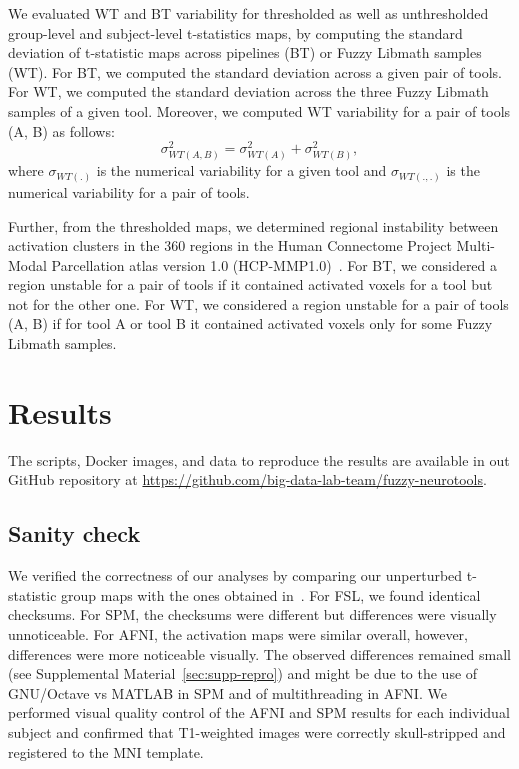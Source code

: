 \documentclass[11pt,onecolumn]{article}
\begin{document}
We evaluated WT and BT variability for thresholded as well as unthresholded
group-level and subject-level t-statistics maps, by computing the
standard deviation of t-statistic maps across pipelines (BT) or Fuzzy Libmath samples (WT). For BT, we computed the standard deviation 
across a given pair of tools.
For WT, we computed the standard deviation across the three
Fuzzy Libmath samples of a given tool. Moreover, we computed WT variability for a pair of tools (A, B) as follows:
\begin{equation}
  \sigma_{WT(A,B)}^2 = \sigma_{WT(A)}^2 + \sigma_{WT(B)}^2,
  \label{eq:wt-pair}
\end{equation}
where $\sigma_{WT(.)}$ is the numerical variability for a given tool
and $\sigma_{WT(., .)}$ is the numerical variability for a pair of tools.

Further, from the thresholded maps, we determined regional instability
between activation clusters in the 360 regions in the Human Connectome
Project Multi-Modal Parcellation atlas version 1.0
(HCP-MMP1.0)~\cite{glasser2016multi}. For BT, we considered a region
unstable for a pair of tools if it contained activated voxels for a tool
but not for the other one. For WT, we considered a region unstable for a
pair of tools (A, B) if for tool A or tool B it contained activated voxels only for some Fuzzy Libmath
samples.

\section{Results}
The scripts, Docker images, and data to reproduce the results are available
in out GitHub repository at
\url{https://github.com/big-data-lab-team/fuzzy-neurotools}.


\subsection{Sanity check}

We verified the correctness of our analyses by comparing our unperturbed
t-statistic group maps with the ones obtained
in~\cite{bowring2019exploring}. For FSL, we found
identical checksums. For SPM, the checksums were different but differences
were visually unnoticeable. For AFNI, the activation maps were similar
overall, however, differences were more noticeable visually. 
The observed differences remained small (see Supplemental Material~\ref{sec:supp-repro}) and might be due to the use of
GNU/Octave vs MATLAB in SPM and of multithreading in AFNI. We performed visual quality control of the AFNI
and SPM results for each individual subject and confirmed that T1-weighted images were
correctly skull-stripped and registered to the MNI template.
\end{document}
